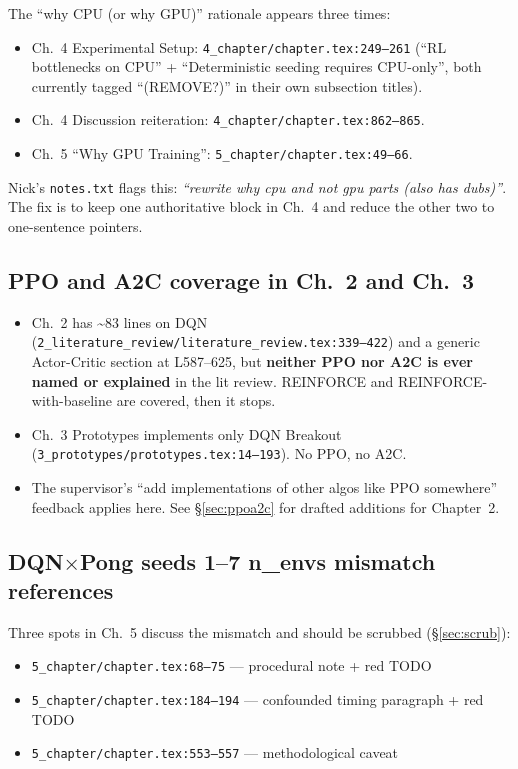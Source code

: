 \documentclass[11pt,a4paper]{article}
\newcommand{\fileline}[1]{\texttt{\small #1}}
\begin{document}
The ``why CPU (or why GPU)'' rationale appears three times:
\begin{itemize}[leftmargin=*]
  \item Ch.~4 Experimental Setup: \fileline{4\_chapter/chapter.tex:249--261}
  (``RL bottlenecks on CPU'' + ``Deterministic seeding requires CPU-only'',
  both currently tagged ``(REMOVE?)'' in their own subsection titles).
  \item Ch.~4 Discussion reiteration: \fileline{4\_chapter/chapter.tex:862--865}.
  \item Ch.~5 ``Why GPU Training'': \fileline{5\_chapter/chapter.tex:49--66}.
\end{itemize}
Nick's \fileline{notes.txt} flags this: \emph{``rewrite why cpu and not gpu
parts (also has dubs)''}. The fix is to keep one authoritative block in
Ch.~4 and reduce the other two to one-sentence pointers.

\subsection*{PPO and A2C coverage in Ch.~2 and Ch.~3}

\begin{itemize}[leftmargin=*]
  \item Ch.~2 has \textasciitilde 83 lines on DQN
  (\fileline{2\_literature\_review/literature\_review.tex:339--422}) and a
  generic Actor-Critic section at L587--625, but \textbf{neither PPO nor
  A2C is ever named or explained} in the lit review. REINFORCE and
  REINFORCE-with-baseline are covered, then it stops.
  \item Ch.~3 Prototypes implements only DQN Breakout
  (\fileline{3\_prototypes/prototypes.tex:14--193}). No PPO, no A2C.
  \item The supervisor's ``add implementations of other algos like PPO
  somewhere'' feedback applies here. See \S\ref{sec:ppoa2c} for drafted
  additions for Chapter~2.
\end{itemize}

\subsection*{DQN$\times$Pong seeds 1--7 n\_envs mismatch references}

Three spots in Ch.~5 discuss the mismatch and should be scrubbed
(\S\ref{sec:scrub}):
\begin{itemize}[leftmargin=*]
  \item \fileline{5\_chapter/chapter.tex:68--75} --- procedural note + red TODO
  \item \fileline{5\_chapter/chapter.tex:184--194} --- confounded timing
  paragraph + red TODO
  \item \fileline{5\_chapter/chapter.tex:553--557} --- methodological caveat
\end{itemize}
\end{document}
